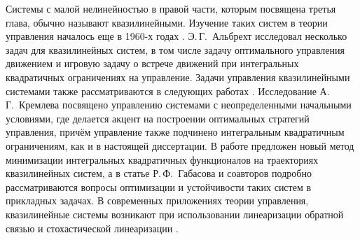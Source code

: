 \documentclass[../main.tex]{subfiles}
\begin{document}
Системы с малой нелинейностью в правой части, которым посвящена третья глава, обычно называют квазилинейными. 
Изучение таких систем в теории управления началось еще в 1960-х годах \cite{Kiselev, Kras_book, Subbotin1967}.
Э.\,Г.~Альбрехт исследовал несколько задач для квазилинейных систем, в том числе задачу оптимального управления движением \cite{Albrecht1} и игровую задачу о встрече движений \cite{Albrecht2} при интегральных квадратичных ограничениях на управление.
Задачи управления квазилинейными системами также рассматриваются в следующих работах \cite{Dauer, Kremlev, KalininLavrinovich2018, Gabasov}.
Исследование А.\,Г.~Кремлева \cite{Kremlev} посвящено управлению системами с неопределенными начальными условиями, где делается акцент на построении оптимальных стратегий управления, причём управление также подчинено интегральным квадратичным ограничениям, как и в настоящей диссертации.
В работе \cite{KalininLavrinovich2018} предложен новый метод минимизации интегральных квадратичных функционалов на траекториях квазилинейных систем, а в статье Р.\,Ф.~Габасова и соавторов \cite{Gabasov} подробно рассматриваются вопросы оптимизации и устойчивости таких систем в прикладных задачах.
В современных приложениях теории управления, квазилинейные системы возникают при использовании линеаризации обратной связью и стохастической линеаризации \cite{Ching, Gui}.



\end{document}
